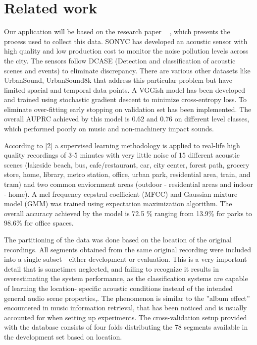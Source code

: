 
\section{Related work}
Our application will be based on the research paper ~ \cite{4}, which presents the process used to collect this data. SONYC has developed an acoustic sensor with high quality and low production cost to monitor the noise pollution levels across the city. The sensors follow DCASE (Detection and classification of acoustic scenes and events) to eliminate discrepancy. There are various other datasets like UrbanSound, UrbanSound8k that address this particular problem but have limited spacial and temporal data points. A VGGish model has been developed and trained using stochastic gradient descent to minimize cross-entropy loss. To eliminate over-fitting early stopping on validation set has been implemented. The overall AUPRC achieved by this model is 0.62 and 0.76 on different level classes, which performed poorly on music and non-machinery impact sounds.

According to [2] a supervised learning methodology is applied to real-life high quality recordings of 3-5 minutes with very little noise of 15 different acoustic scenes (lakeside beach, bus, cafe/restaurant, car, city
center, forest path, grocery store, home, library, metro station,
office, urban park, residential area, train, and tram) and two common enviornment areas (outdoor - residential areas and indoor - home). A mel frequency cepstral coefficient (MFCC) and Gaussian mixture model (GMM) was trained using expectation maximization algorithm. The overall accuracy achieved by the model is 72.5 \% ranging from 13.9\% for parks to 98.6\% for office spaces.

The partitioning of the data was done based on the location
of the original recordings. All segments obtained from the
same original recording were included into a single subset
- either development or evaluation. This is a very important
detail that is sometimes neglected, and failing to recognize
it results in overestimating the system performance, as the
classification systems are capable of learning the location-
specific acoustic conditions instead of the intended general
audio scene properties,. The phenomenon is similar to the
”album effect” encountered in music information retrieval, that
has been noticed and is usually accounted for when setting up
experiments. The cross-validation setup provided with the
database consists of four folds distributing the 78 segments
available in the development set based on location.
